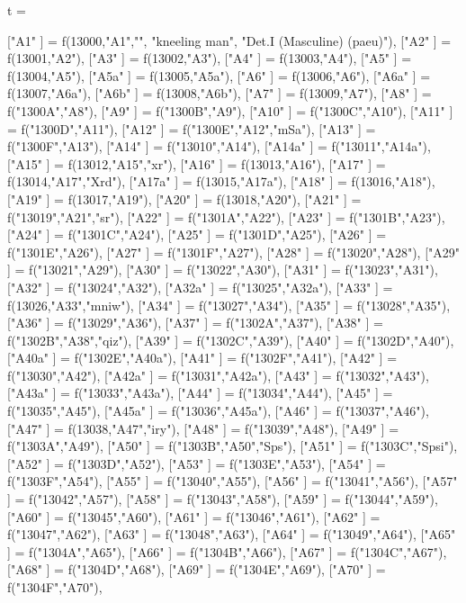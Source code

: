 t = {
   ["A1"    ]       =  f(13000,"A1","",
                         "kneeling man",
                          "Det.I (Masculine) (paeu)"),
   ["A2"    ]  =  f(13001,"A2"),
   ["A3"    ]  =  f(13002,"A3"),
   ["A4"    ]  =  f(13003,"A4"),
   ["A5"    ] =  f(13004,"A5"),
   ["A5a"   ]  =  f(13005,"A5a"),
   ["A6"    ] =  f(13006,"A6"),
   ["A6a"   ] =  f(13007,"A6a"),
   ["A6b"   ] =  f(13008,"A6b"),
   ["A7"    ]  =  f(13009,"A7"),
   ["A8"    ]  =  f("1300A","A8"),
   ["A9"    ]  =  f("1300B","A9"),
   ["A10"   ]  =  f("1300C","A10"),
   ["A11"   ]  =  f("1300D","A11"),
   ["A12"   ]  =  f("1300E","A12","mSa"),
   ["A13"   ]  =  f("1300F","A13"),
   ["A14"   ]  =  f("13010","A14"),
   ["A14a"  ]  =  f("13011","A14a"),
   ["A15"   ] =  f(13012,"A15","xr"),
   ["A16"   ]  =  f(13013,"A16"),
   ["A17"   ]  =  f(13014,"A17","Xrd"),
   ["A17a"  ]  =  f(13015,"A17a"),
   ["A18"   ]  =  f(13016,"A18"),
   ["A19"   ]  =  f(13017,"A19"),
   ["A20"   ]  =  f(13018,"A20"),
   ["A21"   ]  =  f("13019","A21","sr"),
   ["A22"   ]  =  f("1301A","A22"),
   ["A23"   ]  =  f("1301B","A23"),
   ["A24"   ]  =  f("1301C","A24"),
   ["A25"   ]  =  f("1301D","A25"),
   ["A26"   ]  =  f("1301E","A26"),
   ["A27"   ]  =  f("1301F","A27"),
   ["A28"   ]  =  f("13020","A28"),
   ["A29"   ]  =  f("13021","A29"),
   ["A30"   ]  =  f("13022","A30"),
   ["A31"   ]  =  f("13023","A31"),
   ["A32"   ]  =  f("13024","A32"),
   ["A32a"  ]  =  f("13025","A32a"),
   ["A33"   ]  =  f(13026,"A33","mniw"),
   ["A34"   ]  =  f("13027","A34"),
   ["A35"   ]  =  f("13028","A35"),
   ["A36"   ]  =  f("13029","A36"),
   ["A37"   ]  =  f("1302A","A37"),
   ["A38"   ]  =  f("1302B","A38","qiz"),
   ["A39"   ]  =  f("1302C","A39"),
   ["A40"   ]  =  f("1302D","A40"),
   ["A40a"  ]  =  f("1302E","A40a"),
   ["A41"   ]  =  f("1302F","A41"),
   ["A42"   ]  =  f("13030","A42"),
   ["A42a"  ]  =  f("13031","A42a"),
   ["A43"   ]  =  f("13032","A43"),
   ["A43a"  ]  =  f("13033","A43a"),
   ["A44"   ]  =  f("13034","A44"),
   ["A45"   ]  =  f("13035","A45"),
   ["A45a"  ]  =  f("13036","A45a"),
   ["A46"   ]  =  f("13037","A46"),
   ["A47"   ]  =  f(13038,"A47","iry"),
   ["A48"   ]  =  f("13039","A48"),
   ["A49"   ]  =  f("1303A","A49"),
   ["A50"   ]  =  f("1303B","A50","Sps"),
   ["A51"   ]  =  f("1303C","Spsi"),
   ["A52"   ]  =  f("1303D","A52"),
   ["A53"   ]  =  f("1303E","A53"),
   ["A54"   ]  =  f("1303F","A54"),
   ["A55"   ]  =  f("13040","A55"),
   ["A56"   ]  =  f("13041","A56"),
   ["A57"   ]  =  f("13042","A57"),
   ["A58"   ]  =  f("13043","A58"),
   ["A59"   ]       =  f("13044","A59"),
   ["A60"   ]  =  f("13045","A60"),
   ["A61"   ]  =  f("13046","A61"),
   ["A62"   ]       =  f("13047","A62"),
   ["A63"   ]  =  f("13048","A63"),
   ["A64"   ]  =  f("13049","A64"),
   ["A65"   ]  =  f("1304A","A65"),
   ["A66"   ]  =  f("1304B","A66"),
   ["A67"   ]  =  f("1304C","A67"),
   ["A68"   ]  =  f("1304D","A68"),
   ["A69"   ]  =  f("1304E","A69"),
   ["A70"   ]  =  f("1304F","A70"),

}
